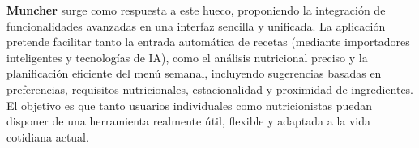 \textbf{Muncher} surge como respuesta a este hueco, proponiendo la integración de funcionalidades avanzadas en una interfaz sencilla y unificada. La aplicación pretende facilitar tanto la entrada automática de recetas (mediante importadores inteligentes y tecnologías de IA), como el análisis nutricional preciso y la planificación eficiente del menú semanal, incluyendo sugerencias basadas en preferencias, requisitos nutricionales, estacionalidad y proximidad de ingredientes. El objetivo es que tanto usuarios individuales como nutricionistas puedan disponer de una herramienta realmente útil, flexible y adaptada a la vida cotidiana actual.